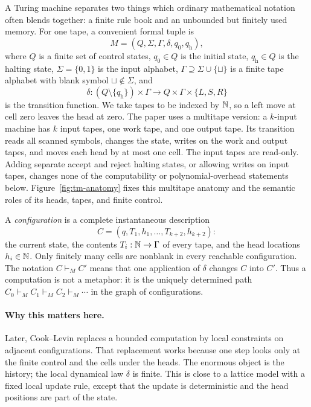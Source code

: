A Turing machine separates two things which ordinary mathematical notation
often blends together: a finite rule book and an unbounded but finitely used
memory.  For one tape, a convenient formal tuple is
\[
 M=(Q,\Sigma,\Gamma,\delta,q_0,q_{\mathrm h}),
\]
where \(Q\) is a finite set of control states, \(q_0\in Q\) is the initial
state, \(q_{\mathrm h}\in Q\) is the halting state,
\(\Sigma=\{0,1\}\) is the input alphabet,
\(\Gamma\supseteq\Sigma\cup\{\sqcup\}\) is a finite tape alphabet with blank
symbol \(\sqcup\notin\Sigma\), and
\[
 \delta:(Q\setminus\{q_{\mathrm h}\})\times\Gamma
 \longrightarrow Q\times\Gamma\times\{L,S,R\}
\]
is the transition function.  We take tapes to be indexed by \(\mathbb N\), so a
left move at cell zero leaves the head at zero.  The paper uses a multitape
version: a \(k\)-input machine has \(k\) input tapes, one work tape, and one
output tape.  Its transition reads all scanned symbols, changes the state,
writes on the work and output tapes, and moves each head by at most one cell.
The input tapes are read-only.  Adding separate accept and reject halting
states, or allowing writes on input tapes, changes none of the computability
or polynomial-overhead statements below.
Figure~\ref{fig:tm-anatomy} fixes this multitape anatomy and the semantic roles
of its heads, tapes, and finite control.

A \emph{configuration} is a complete instantaneous description
\[
 C=(q,T_1,h_1,\ldots,T_{k+2},h_{k+2}):
\]
the current state, the contents \(T_i:\mathbb N\to\Gamma\) of every tape, and the
head locations \(h_i\in\mathbb N\).  Only finitely many cells are nonblank in every
reachable configuration.  The notation \(C\vdash_M C'\) means that one
application of \(\delta\) changes \(C\) into \(C'\).  Thus a computation is
not a metaphor: it is the uniquely determined path
\(C_0\vdash_M C_1\vdash_M C_2\vdash_M\cdots\) in the graph of configurations.

\paragraph{Why this matters here.}
Later, Cook--Levin replaces a bounded computation by local constraints on
adjacent configurations.  That replacement works because one step looks only
at the finite control and the cells under the heads.  The enormous object is
the history; the local dynamical law \(\delta\) is finite.  This is close to a
lattice model with a fixed local update rule, except that the update is
deterministic and the head positions are part of the state.

